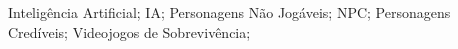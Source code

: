 \noindent Inteligência Artificial; IA; Personagens Não Jogáveis; NPC; Personagens Credíveis; Videojogos de Sobrevivência;